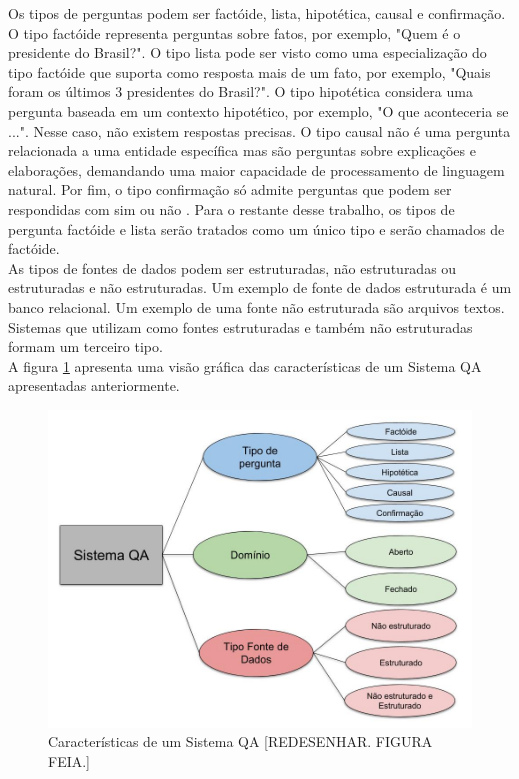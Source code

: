 \documentclass{article}
\begin{document}
Os tipos de perguntas podem ser factóide, lista, hipotética, causal e confirmação. O tipo factóide representa perguntas sobre fatos, por exemplo, "Quem é o presidente do Brasil?". O tipo lista pode ser visto como uma especialização do tipo factóide que suporta como resposta mais de um fato, por exemplo, "Quais foram os últimos 3 presidentes do Brasil?". O tipo hipotética considera uma pergunta baseada em um contexto hipotético, por exemplo, "O que aconteceria se ...". Nesse caso, não existem respostas precisas. O tipo causal não é uma pergunta relacionada a uma entidade específica mas são perguntas sobre explicações e elaborações, demandando uma maior capacidade de processamento de linguagem natural. Por fim, o tipo confirmação só admite perguntas que podem ser respondidas com sim ou não \citep{mishra2016survey}. Para o restante desse trabalho, os tipos de pergunta factóide e lista serão tratados como um único tipo e serão chamados de factóide.\\

As tipos de fontes de dados podem ser estruturadas, não estruturadas ou estruturadas e não estruturadas. Um exemplo de fonte de dados estruturada é um banco relacional. Um exemplo de uma fonte não estruturada são arquivos textos. Sistemas que utilizam como fontes estruturadas e também não estruturadas formam um terceiro tipo.\\

A figura \ref{fig:SistemaQA} apresenta uma visão gráfica das características de um Sistema QA apresentadas anteriormente.\\

\begin{figure}[h!]
\centering
\includegraphics[scale=0.3]{SistemaQA2.jpg}
\caption{Características de um Sistema QA [REDESENHAR. FIGURA FEIA.]}
\label{fig:SistemaQA}
\end{figure}
\end{document}
